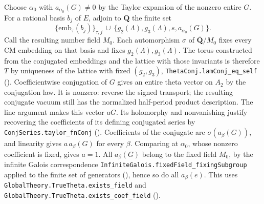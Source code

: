 Choose \(\alpha_0\) with \(a_{\alpha_0}(G)\ne0\) by the Taylor expansion
of the nonzero entire \(G\). For a rational basis \(b_j\) of \(E\),
adjoin to \(\mathbf Q\) the finite set
\[
 \{\mathrm{emb}_\tau(b_j)\}_{\tau,j}
 \ \cup\ \{g_2(\Lambda),g_3(\Lambda),s,a_{\alpha_0}(G)\}.
\]
Call the resulting number field \(M_0\). Each automorphism \(\sigma\) of
\(\overline{\mathbf Q}/M_0\) fixes every CM embedding on that basis
and fixes \(g_2(\Lambda),g_3(\Lambda)\). The torus constructed from the
conjugated embeddings and the lattice with those invariants is
therefore \(T\) by uniqueness of the lattice with fixed $(g_2,g_3)$,
\nolinkurl{ThetaConj.lamConj_eq_self}
().
Coefficientwise conjugation of \(G\) gives an
entire theta vector on \(A_2\) by the conjugation law. It is nonzero:
reverse the signed transport; the resulting conjugate vacuum still
has the normalized half-period product description. The line argument
makes this vector \(aG\). Its holomorphy and nonvanishing justify recovering
the coefficients of its defining conjugated series by
\nolinkurl{ConjSeries.taylor_fnConj}
().
Coefficients of the conjugate are
\(\sigma(a_\beta(G))\), and linearity gives \(a\,a_\beta(G)\)
for every \(\beta\). Comparing at \(\alpha_0\), whose nonzero
coefficient is fixed, gives \(a=1\). All \(a_\beta(G)\) belong to
the fixed field \(M_0\), by the infinite Galois correspondence
\nolinkurl{InfiniteGalois.fixedField_fixingSubgroup} applied to the finite
set of generators (), hence so do all \(a_\beta(e)\). This uses
\nolinkurl{GlobalTheory.TrueTheta.exists_field} and
\nolinkurl{GlobalTheory.TrueTheta.exists_coef_field}
().

